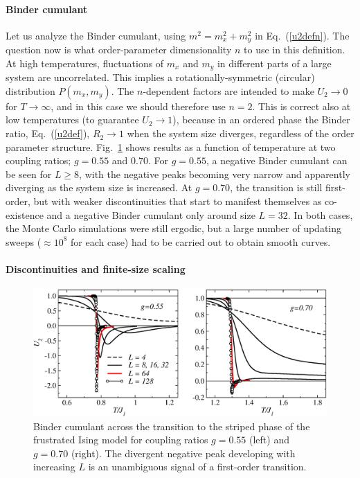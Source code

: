 \documentclass[draft,numberedheadings]{aipproc}
\begin{document}
\paragraph{Binder cumulant}

Let us analyze the Binder cumulant, using $m^2=m_x^2+m_y^2$ in Eq.~(\ref{u2defn}). The question now is what order-parameter dimensionality $n$ to use in
this definition. At high temperatures, fluctuations of $m_x$ and $m_y$ in different parts of a large system are uncorrelated. This implies a 
rotationally-symmetric (circular) distribution $P(m_x,m_y)$. The $n$-dependent factors are intended to make $U_2 \to 0$ for $T\to \infty$, and in this 
case we should therefore use $n=2$. This is correct also at low temperatures (to guarantee $U_2 \to 1$), because in an ordered phase the Binder ratio, 
Eq.~(\ref{u2def}), $R_2 \to 1$ when the system size diverges, regardless of the order parameter structure. Fig.~\ref{j1j2binder} shows results as a function
of temperature at two coupling ratios; $g=0.55$ and $0.70$. For $g=0.55$, a negative Binder cumulant can be seen for $L\ge 8$, with the negative peaks 
becoming very narrow and apparently diverging as the system size is increased. At $g=0.70$, the transition is still first-order, but with weaker 
discontinuities that start to manifest themselves as co-existence and a negative Binder cumulant only around size $L=32$. In both cases, the Monte Carlo
simulations were still ergodic, but a large number of updating sweeps ($\approx 10^8$ for each case) had to be carried out
to obtain smooth curves.

\paragraph{Discontinuities and finite-size scaling}

\begin{figure}
\includegraphics[width=12cm, clip]{j1j2binder.eps}
\caption{Binder cumulant across the transition to the striped phase of the frustrated Ising model for coupling ratios $g=0.55$ (left) 
and $g=0.70$ (right). The divergent negative peak developing with increasing $L$ is an unambiguous signal of a first-order transition.}
\label{j1j2binder}
\end{figure}
\end{document}
